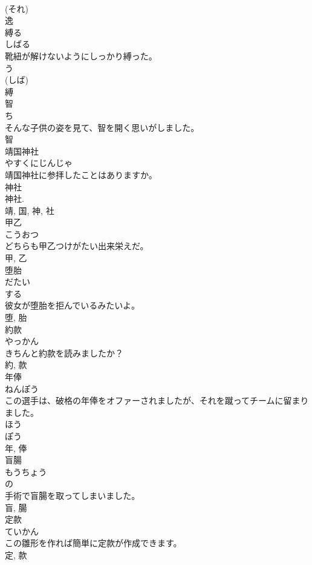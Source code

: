 \documentclass[8pt]{extreport}
\begin{document}
\begin{CJK}{UTF8}{min}
\\	(それ) 
\\	逸	
\\	縛る	
\\	しばる	
\\	靴紐が解けないようにしっかり縛った。	
\\	う 
\\	(しば) 
\\	縛	
\\	智	
\\	ち	
\\	そんな子供の姿を見て、智を開く思いがしました。	
\\	智	
\\	靖国神社	
\\	やすくにじんじゃ	
\\	靖国神社に参拝したことはありますか。	
\\	神社 
\\	神社. 
\\	靖, 国, 神, 社	
\\	甲乙	
\\	こうおつ	
\\	どちらも甲乙つけがたい出来栄えだ。	
\\	甲, 乙	
\\	堕胎	
\\	だたい	
\\	する 
\\	彼女が堕胎を拒んでいるみたいよ。	
\\	堕, 胎	
\\	約款	
\\	やっかん	
\\	きちんと約款を読みましたか？	
\\	約, 款	
\\	年俸	
\\	ねんぽう	
\\	この選手は、破格の年俸をオファーされましたが、それを蹴ってチームに留まりました。	
\\	ほう 
\\	ぽう 
\\	年, 俸	
\\	盲腸	
\\	もうちょう	
\\	の 
\\	手術で盲腸を取ってしまいました。	
\\	盲, 腸	
\\	定款	
\\	ていかん	
\\	この雛形を作れば簡単に定款が作成できます。	
\\	定, 款	

\end{CJK}
\end{document}
